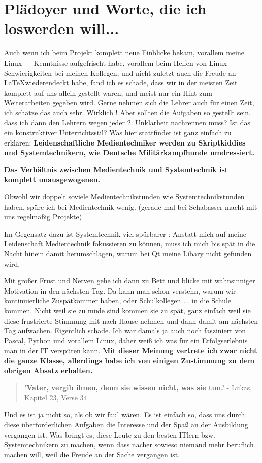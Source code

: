 \newpage
\section{Plädoyer und Worte, die ich loswerden will...}
Auch wenn ich beim Projekt komplett neue Einblicke bekam, vorallem meine Linux --- Kenntnisse aufgefrischt habe, vorallem beim Helfen von Linux-Schwierigkeiten bei meinen Kollegen, und nicht zuletzt auch die Freude an \LaTeX  wiederendeckt habe, fand ich es schade, dass wir in der meisten Zeit komplett auf uns allein gestellt waren, und meist nur ein Hint zum Weiterarbeiten gegeben wird. Gerne nehmen sich die Lehrer auch für einen Zeit, ich schätze das auch sehr. Wirklich ! Aber sollten die Aufgaben so gestellt sein, dass ich dann den Lehrern wegen jeder 2. Unklarheit nachrennen muss? Ist das ein konstruktiver Unterrichtsstil?
Was hier stattfindet ist ganz einfach zu erklären:
\linebreak
\textbf{Leidenschaftliche Medientechniker werden zu Skriptkiddies und Systemtechnikern, wie Deutsche Militärkampfhunde umdressiert.}

\textbf{Das Verhältnis zwischen Medientechnik und Systemtechnik ist komplett unausgewogenen.}

Obwohl wir doppelt soviele Medientechnikstunden wie Systemtechnikstunden haben, spüre ich bei Medientechnik wenig. (gerade mal bei Schabasser macht mit uns regelmäßig Projekte)

Im Gegensatz dazu ist Systemtechnik viel spürbarer : 
Anstatt mich auf meine Leidenschaft Medientechnik fokussieren zu können, muss ich mich bis spät in die Nacht hinein damit herumschlagen, warum bei Qt meine Libary nicht gefunden wird.

Mit großer Frust und Nerven gehe ich dann zu Bett und blicke mit wahnsinniger Motivation in den nächsten Tag. Da kann man schon verstehn, warum wir kontinuierliche Zuspätkommer haben, oder Schulkollegen ... in die Schule kommen.
Nicht weil sie zu müde sind kommen sie zu spät, ganz einfach weil sie diese frustrierte Stimmung mit nach Hause nehmen und dann damit am nächsten Tag aufwachen.
Eigentlich schade. Ich war damals ja auch noch fasziniert von Pascal, Python und vorallem Linux, daher weiß ich was für ein Erfolgserlebnis man in der IT verspüren kann.
\textbf{Mit dieser Meinung vertrete ich zwar nicht die ganze Klasse, allerdings habe ich von einigen Zustimmung zu dem obrigen Absatz erhalten.}

\begin{quote}
	\textbf{'Vater, vergib ihnen, denn sie wissen nicht, was sie tun.'}\linebreak
	- Lukas, Kapitel 23, Verse 34
\end{quote}

Und es ist ja nicht so, als ob wir faul wären. Es ist einfach so, dass uns durch diese überforderlichen Aufgaben die Interesse und der Spaß an der Ausbildung vergangen ist.
Was bringt es, diese Leute zu den besten ITlern bzw. Systemtechnikern zu machen, wenn dass nacher sowieso niemand mehr beruflich machen will, weil die Freude an der Sache vergangen ist.